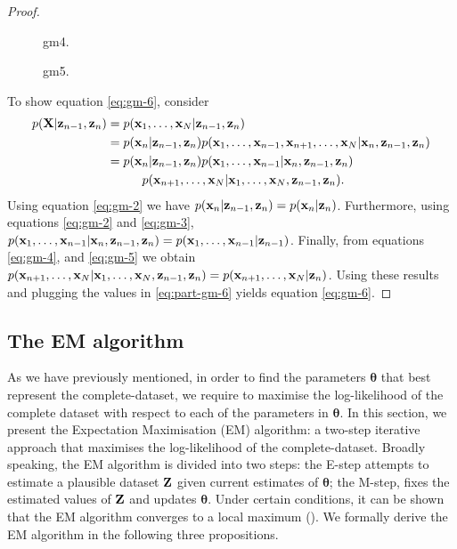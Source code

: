 \documentclass[11pt]{article}
\numberwithin{equation}{section}
\newcommand{\x}{{\bf x}}
\newcommand{\X}{{\bf X}}
\newcommand{\z}{{\bf z}}
\newcommand{\Z}{{\bf Z}}
\begin{document}
\begin{proof}
	\begin{figure}[h!]
		\centering
		\resizebox{\columnwidth}{!}{}
		\caption{gm4.}
		\label{fig:gm-4}
	\end{figure}
	
	\begin{figure}[h!]
		\centering
		\resizebox{\columnwidth}{!}{}
		\caption{gm5.}
		\label{fig:gm-5}
	\end{figure}
	
	To show equation \eqref{eq:gm-6}, consider
	\begin{align}
		p(\X \vert \z_{n-1}, \z_n) &= p(\x_1, \ldots, \x_N \vert \z_{n-1},\z_n)\\
		 &= p(\x_n \vert \z_{n-1}, \z_n) p(\x_1, \ldots, \x_{n-1}, \x_{n+1}, \ldots, \x_N \vert \x_n, \z_{n-1}, \z_n)\\
		&= p(\x_n \vert \z_{n-1}, \z_n) p(\x_1, \ldots, \x_{n-1} \vert \x_n, \z_{n-1}, \z_n) \nonumber\\
			&\hspace{1cm} p(\x_{n+1}, \ldots, \x_N \vert \x_1, \ldots, \x_N, \z_{n-1}, \z_n). \label{eq:part-gm-6}
	\end{align}
	Using equation \eqref{eq:gm-2} we have $p(\x_n \vert \z_{n-1}, \z_n) = p(\x_n \vert \z_n)$. Furthermore, using equations \eqref{eq:gm-2} and \eqref{eq:gm-3}, $p(\x_1, \ldots, \x_{n-1} \vert \x_n, \z_{n-1}, \z_n) = p(\x_1, \ldots, \x_{n-1} \vert \z_{n-1})$. Finally, from equations \eqref{eq:gm-4}, and \eqref{eq:gm-5} we obtain  $p(\x_{n+1}, \ldots, \x_N \vert \x_1, \ldots, \x_N, \z_{n-1}, \z_n) = p(\x_{n+1}, \ldots, \x_N \vert  \z_{n})$. Using these results and plugging the values in \eqref{eq:part-gm-6} yields equation \eqref{eq:gm-6}.
\end{proof}


\subsection{The EM algorithm}

As we have previously mentioned, in order to find the parameters $\boldsymbol{\theta}$ that best represent the complete-dataset, we require to maximise the log-likelihood of the complete dataset with respect to each of the parameters in $\boldsymbol{\theta}$. In this section, we present the Expectation Maximisation (EM) algorithm: a two-step iterative approach that maximises the log-likelihood of the complete-dataset. Broadly speaking, the EM algorithm is divided into two steps: the E-step attempts to estimate a plausible dataset $\Z$ given current estimates of $\boldsymbol\theta$; the M-step, fixes the estimated values of $\Z$ and updates $\boldsymbol{\theta}$. Under certain conditions, it can be shown that the EM algorithm converges to a local maximum (\cite{pml1Book}). We formally derive the EM algorithm in the following three propositions.
\end{document}
